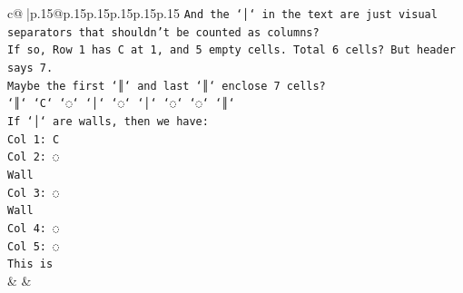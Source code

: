 \documentclass{article}
\begin{document}
{\begin{supertabular}{c@{$\;$}|p{.15\linewidth}@{}p{.15\linewidth}p{.15\linewidth}p{.15\linewidth}p{.15\linewidth}p{.15\linewidth}}
{{{\texttt{And the `│` in the text are just visual separators that shouldn't be counted as columns?} \\
\texttt{If so, Row 1 has C at 1, and 5 empty cells. Total 6 cells? But header says 7.} \\
\texttt{Maybe the first `║` and last `║` enclose 7 cells?} \\
\texttt{`║` `C` `◌` `│` `◌` `│` `◌` `◌` `║`} \\
\texttt{If `│` are walls, then we have:} \\
\texttt{Col 1: C} \\
\texttt{Col 2: ◌} \\
\texttt{Wall} \\
\texttt{Col 3: ◌} \\
\texttt{Wall} \\
\texttt{Col 4: ◌} \\
\texttt{Col 5: ◌} \\
\texttt{This is} \\
            }
        }
    }
    & & \\ \\


\end{supertabular}}
\end{document}
